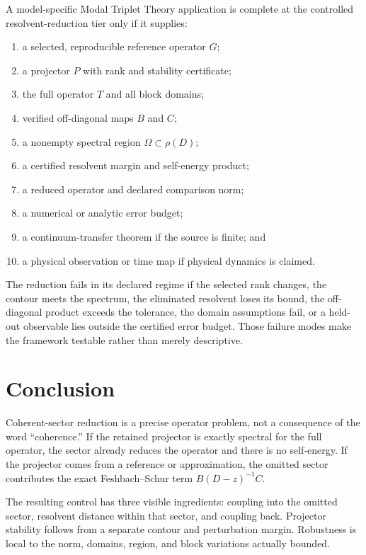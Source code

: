 \documentclass[11pt]{article}
\theoremstyle{definition}
\theoremstyle{remark}
\newcommand{\1}{\mathbf 1}
\newcommand{\MTT}{Modal Triplet Theory}
\begin{document}
A model-specific \MTT{} application is complete at the controlled
resolvent-reduction tier only if it supplies:
\begin{enumerate}[leftmargin=2em]
\item a selected, reproducible reference operator \(G\);
\item a projector \(P\) with rank and stability certificate;
\item the full operator \(T\) and all block domains;
\item verified off-diagonal maps \(B\) and \(C\);
\item a nonempty spectral region \(\Omega\subset\rho(D)\);
\item a certified resolvent margin and self-energy product;
\item a reduced operator and declared comparison norm;
\item a numerical or analytic error budget;
\item a continuum-transfer theorem if the source is finite; and
\item a physical observation or time map if physical dynamics is claimed.
\end{enumerate}

The reduction fails in its declared regime if the selected rank changes,
the contour meets the spectrum, the eliminated resolvent loses its bound,
the off-diagonal product exceeds the tolerance, the domain assumptions
fail, or a held-out observable lies outside the certified error budget.
Those failure modes make the framework testable rather than merely
descriptive.

\section{Conclusion}
\label{sec:conclusion}

Coherent-sector reduction is a precise operator problem, not a consequence
of the word ``coherence.''  If the retained projector is exactly spectral
for the full operator, the sector already reduces the operator and there
is no self-energy.  If the projector comes from a reference or
approximation, the omitted sector contributes the exact
Feshbach--Schur term \(B(D-z)^{-1}C\).

The resulting control has three visible ingredients: coupling into the
omitted sector, resolvent distance within that sector, and coupling back.
Projector stability follows from a separate contour and perturbation
margin.  Robustness is local to the norm, domains, region, and block
variations actually bounded.
\end{document}

